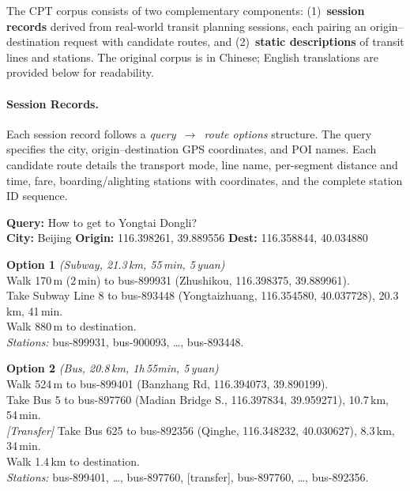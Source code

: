 \documentclass{llmxive}
\providecommand{\dashrule}{\noindent\makebox[\linewidth]{\dashrulefill}}
\providecommand{\dashrulefill}{\leaders\hbox to 5pt{\hss\rule{3pt}{0.4pt}\hss}\hfill}
\begin{document}
The CPT corpus consists of two complementary components: (1)~\textbf{session records} derived from real-world transit planning sessions, each pairing an origin--destination request with candidate routes, and (2)~\textbf{static descriptions} of transit lines and stations. The original corpus is in Chinese; English translations are provided below for readability.

\paragraph{Session Records.}
Each session record follows a \textit{query~$\rightarrow$~route options} structure. The query specifies the city, origin--destination GPS coordinates, and POI names. Each candidate route details the transport mode, line name, per-segment distance and time, fare, boarding/alighting stations with coordinates, and the complete station ID sequence.

\begin{tcolorbox}[colback=gray!3, colframe=black!40, boxrule=0.4pt, arc=2pt, left=6pt, right=6pt, top=4pt, bottom=4pt, fontupper=\small, fontlower=\small, breakable, title={\small\textbf{CPT Session Record}}]
\textbf{Query:} How to get to Yongtai Dongli? \\
\textbf{City:} Beijing \quad \textbf{Origin:} 116.398261, 39.889556 \quad \textbf{Dest:} 116.358844, 40.034880

\tcblower

\textbf{Option 1} \textit{(Subway, 21.3\,km, 55\,min, 5\,yuan)} \\[2pt]
Walk 170\,m (2\,min) to bus-899931 (Zhushikou, 116.398375, 39.889961). \\
Take Subway Line 8 to bus-893448 (Yongtaizhuang, 116.354580, 40.037728), 20.3\,km, 41\,min. \\
Walk 880\,m to destination. \\[2pt]
\textit{Stations:} bus-899931, bus-900093, \ldots, bus-893448.

\vspace{4pt}
\noindent\dashrule
\vspace{4pt}

\textbf{Option 2} \textit{(Bus, 20.8\,km, 1h\,55min, 5\,yuan)} \\[2pt]
Walk 524\,m to bus-899401 (Banzhang Rd, 116.394073, 39.890199). \\
Take Bus 5 to bus-897760 (Madian Bridge S., 116.397834, 39.959271), 10.7\,km, 54\,min. \\
\textit{[Transfer]} Take Bus 625 to bus-892356 (Qinghe, 116.348232, 40.030627), 8.3\,km, 34\,min. \\
Walk 1.4\,km to destination. \\[2pt]
\textit{Stations:} bus-899401, \ldots, bus-897760, [transfer], bus-897760, \ldots, bus-892356.
\end{tcolorbox}
\end{document}
